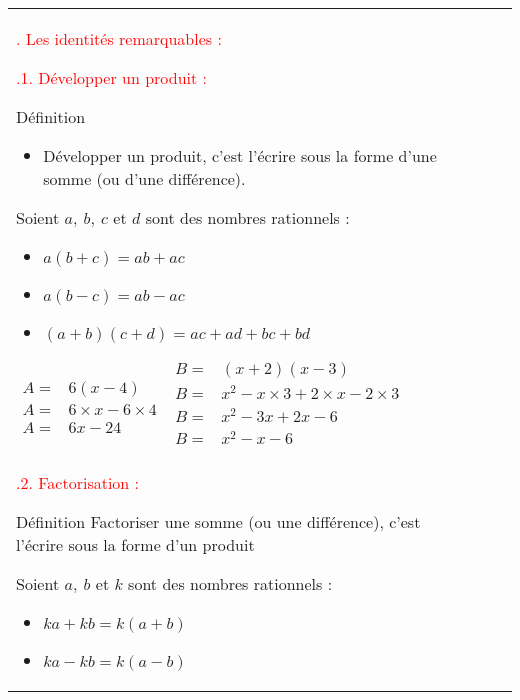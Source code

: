 \documentclass[10pt,a4paper]{article}
\newcounter{mysection}
\newcounter{mysubsection}
\newcommand{\mysection}[1]{%
    \stepcounter{mysection} %
    \textcolor{red}{\LARGE\themysection. #1 :}
}
\newcommand{\mysubsection}[2]{
    \stepcounter{mysubsection}
    \textcolor{red}{\large \themysection.#1. #2 :}
}
\begin{document}
\begin{tabular}{|>{\centering\arraybackslash}p{1.2cm}|>{\raggedright\arraybackslash}p{15.5cm}|>{\centering\arraybackslash}p{0.8cm}|}
\mysection{Les identités remarquables} \newline
\mysubsection{1}{Développer un produit}
\begin{Def}{Définition}
    \begin{itemize}
        \item Développer un produit, c’est l’écrire sous la forme d’une somme (ou d’une différence).
    \end{itemize}
\end{Def}

\begin{Prop}
    Soient $a,\ b,\ c$ et $d$ sont des nombres rationnels :
    \begin{multicols}{2}
        \begin{itemize}
            \item $a(b+c) = ab+ac$
            \item $a(b-c) = ab-ac$
            \item $(a+b)(c+d) = ac+ad+bc+bd$
        \end{itemize}
    \end{multicols}
\end{Prop}

\begin{exemple}
  \begin{multicols}{2}
       $\begin{array}{ll}
        A = & 6(x-4) \\
        A = & 6\times x - 6\times4 \\
        A = & 6x-24
    \end{array}$
    \vfill
    \columnbreak
     $\begin{array}{ll}
        B = & (x+2)(x-3) \\
        B = & x^2 -x\times3 + 2\times x - 2\times 3 \\
        B = & x^2 -3x + 2x - 6 \\
        B = & x^2 -x - 6 \\
    \end{array}$
  \end{multicols}
\end{exemple}

\mysubsection{2}{Factorisation}
\begin{Def}{Définition}
    Factoriser une somme (ou une différence), c’est l’écrire sous la forme d’un produit
\end{Def}

\begin{Prop}
    Soient $a,\ b$ et $k$ sont des nombres rationnels :
    \begin{multicols}{2}
        \begin{itemize}
            \item $ka+kb = k(a+b)$
            \item $ka-kb = k(a-b)$
        \end{itemize}
    \end{multicols}
\end{Prop}


\end{tabular}
\end{document}
